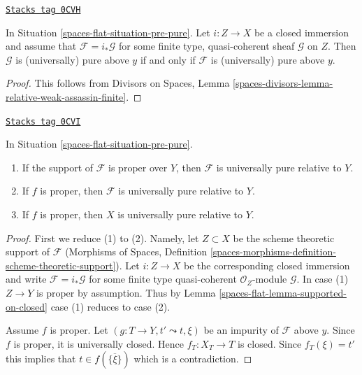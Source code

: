 \begin{lemma}
\label{spaces-flat-lemma-supported-on-closed}
\href{https://stacks.math.columbia.edu/tag/0CVH}{\texttt{Stacks tag 0CVH}}

In Situation \ref{spaces-flat-situation-pre-pure}. Let $i : Z \to X$ be a closed immersion
and assume that $\mathcal{F} = i_*\mathcal{G}$ for some
finite type, quasi-coherent sheaf $\mathcal{G}$ on $Z$.
Then $\mathcal{G}$ is (universally) pure above $y$
if and only if $\mathcal{F}$ is (universally) pure above $y$.
\end{lemma}

\begin{proof}
This follows from Divisors on Spaces, Lemma
\ref{spaces-divisors-lemma-relative-weak-assassin-finite}.
\end{proof}

\begin{lemma}
\label{spaces-flat-lemma-proper-pure}
\href{https://stacks.math.columbia.edu/tag/0CVI}{\texttt{Stacks tag 0CVI}}

In Situation \ref{spaces-flat-situation-pre-pure}.
\begin{enumerate}
\item If the support of $\mathcal{F}$ is proper over $Y$, then
$\mathcal{F}$ is universally pure relative to $Y$.
\item If $f$ is proper, then
$\mathcal{F}$ is universally pure relative to $Y$.
\item If $f$ is proper, then $X$ is universally pure relative to $Y$.
\end{enumerate}
\end{lemma}

\begin{proof}
First we reduce (1) to (2). Namely, let $Z \subset X$ be the
scheme theoretic support of $\mathcal{F}$
(Morphisms of Spaces, Definition
\ref{spaces-morphisms-definition-scheme-theoretic-support}). Let $i : Z \to X$
be the corresponding closed immersion and write
$\mathcal{F} = i_*\mathcal{G}$ for some finite type quasi-coherent
$\mathcal{O}_Z$-module $\mathcal{G}$.
In case (1) $Z \to Y$ is proper by assumption.
Thus by Lemma \ref{spaces-flat-lemma-supported-on-closed} case (1) reduces to case (2).

\medskip\noindent
Assume $f$ is proper.
Let $(g : T \to Y, t' \leadsto t, \xi)$ be an impurity of $\mathcal{F}$
above $y$. Since $f$ is proper, it is universally closed. Hence
$f_T : X_T \to T$ is closed. Since $f_T(\xi) = t'$ this implies that
$t \in f(\overline{\{\xi\}})$ which is a contradiction.
\end{proof}

